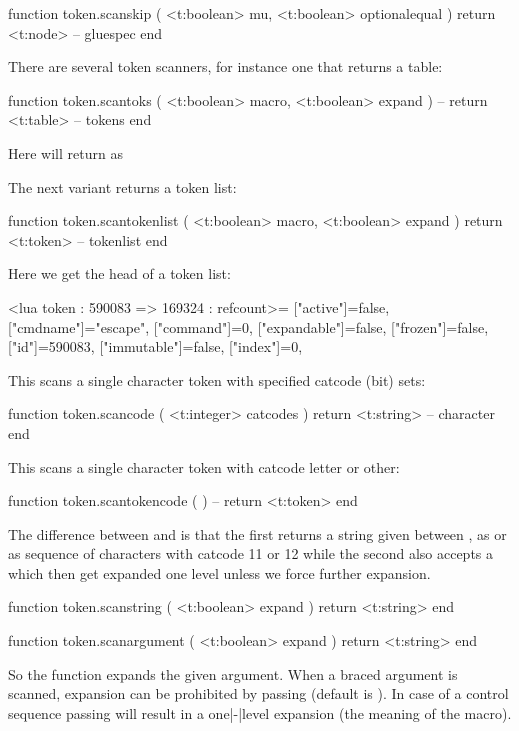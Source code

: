 \starttyping[option=LUA]
function token.scanskip (
    <t:boolean> mu,
    <t:boolean> optionalequal
)
    return <t:node> -- gluespec
end
\stoptyping

There are several token scanners, for instance one that returns a table:

\starttyping[option=LUA]
function token.scantoks (
    <t:boolean> macro,
    <t:boolean> expand
)
    -- return <t:table> -- tokens
end
\stoptyping

Here  will return  as

\stoptyping

The next variant returns a token list:

\starttyping[option=LUA]
function token.scantokenlist (
    <t:boolean> macro,
    <t:boolean> expand
)
    return <t:token> -- tokenlist
end
\stoptyping

Here we get the head of a token list:

\starttyping[option=LUA]
<lua token : 590083 => 169324 : refcount>={
 ["active"]=false,
 ["cmdname"]="escape",
 ["command"]=0,
 ["expandable"]=false,
 ["frozen"]=false,
 ["id"]=590083,
 ["immutable"]=false,
 ["index"]=0,
}
\stoptyping

This scans a single character token with specified catcode (bit) sets:

\starttyping[option=LUA]
function token.scancode ( <t:integer> catcodes )
    return <t:string> -- character
end
\stoptyping

This scans a single character token with catcode letter or other:

\starttyping[option=LUA]
function token.scantokencode ( )
    -- return <t:token>
end
\stoptyping

The difference between  and  is that the
first returns a string given between \type {{}}, as \type {\macro} or as sequence
of characters with catcode 11 or 12 while the second also accepts a \type {\cs}
which then get expanded one level unless we force further expansion.

\starttyping[option=LUA]
function token.scanstring ( <t:boolean> expand )
    return <t:string>
end

function token.scanargument ( <t:boolean> expand )
    return <t:string>
end
\stoptyping

So the  function expands the given argument. When a braced
argument is scanned, expansion can be prohibited by passing 
(default is ). In case of a control sequence passing 
will result in a one|-|level expansion (the meaning of the macro).

